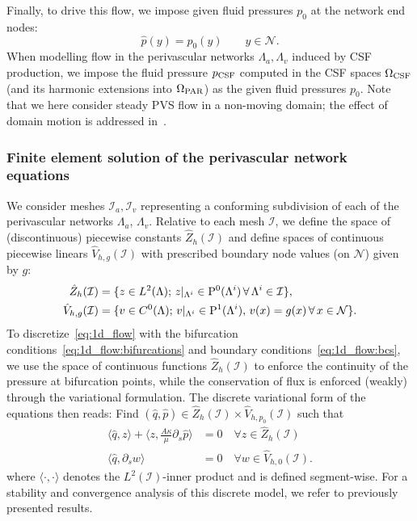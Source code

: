 \documentclass[fleqn,10pt]{wlscirep}
\begin{document}
Finally, to drive this flow, we impose given fluid pressures $p_0$ at the
network end nodes:
\begin{equation}
  \hat{p}(y) = p_0(y) \qquad y \in \mathcal{N} .
  \label{eq:1d_flow:bcs}
\end{equation}
When modelling flow in the perivascular networks
$\Lambda_a, \Lambda_v$ induced by CSF production, we impose the fluid
pressure $p_{\rm CSF}$ computed in the CSF spaces $\Omega_{\rm CSF}$
(and its harmonic extensions into $\Omega_{\rm PAR}$) as the given
fluid pressures $p_0$. Note that we here consider steady PVS flow in a
non-moving domain; the effect of domain motion is addressed
in~.

\subsubsection{Finite element solution of the perivascular network equations} 
We consider meshes $\mathcal{I}_a, \mathcal{I}_v$ representing a
conforming subdivision of each of the perivascular networks
$\Lambda_a$, $\Lambda_v$. Relative to each mesh $\mathcal{I}$, we define the
space of (discontinuous) piecewise constants $\widehat{Z}_h(\mathcal{I})$ and define
spaces of continuous piecewise linears $\hat{V}_{h, g}(\mathcal{I})$ with
prescribed boundary node values (on $\mathcal{N}$) given by $g$:
\begin{align}
  \hat{Z}_h(\mathcal{I}) &= \{z \in L^2(\Lambda) ; \, z \vert_{\Lambda^i} \in \mathrm{P}^{0}(\Lambda^i) \, \forall \, \Lambda^i \in \mathcal{I}\}, \\
  \hat{V}_{h, g}(\mathcal{I}) &= \{ v \in C^0(\Lambda) ; \, v \vert_{\Lambda^i} \in \mathrm{P}^1(\Lambda^i), \, v(x) = g(x) \, \forall \, x \in \mathcal{N} \} .
\end{align}
To discretize~\eqref{eq:1d_flow} with the bifurcation
conditions~\eqref{eq:1d_flow:bifurcations} and boundary
conditions~\eqref{eq:1d_flow:bcs}, we use the space of continuous
functions $\hat{Z}_h(\mathcal{I})$ to enforce the continuity of the pressure at
bifurcation points, while the conservation of flux is enforced
(weakly) through the variational formulation. The discrete variational form of the equations then reads: Find $(\hat{q}, \hat{p}) \in \hat{Z}_h(\mathcal{I}) \times \hat{V}_{h, p_0}(\mathcal{I})$ such that
\begin{subequations}
\begin{align}
  \langle \hat{q}, z \rangle +  \langle z, \frac{A \kappa}{\mu} \partial_s \hat{p}  \rangle &= 0 \quad \forall z \in \hat{Z}_h(\mathcal{I}) \\
  \langle \hat{q}, \partial_s w \rangle &= 0 \quad  \forall w \in \hat{V}_{h, 0}(\mathcal{I}).
\end{align}
\end{subequations}%
where $\langle \cdot, \cdot \rangle$ denotes the $L^2(\mathcal{I})$-inner product and is defined segment-wise. For a stability and convergence analysis of this discrete model, we refer to previously presented results\cite{gjerde2024directional}. 
\end{document}
